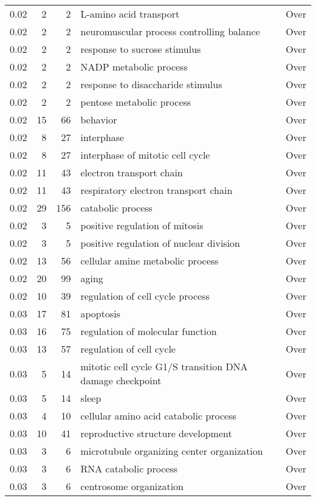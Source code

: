 \documentclass[10pt]{bmc_article}
\newenvironment{bmcformat}{\begin{raggedright}\baselineskip20pt\sloppy\setboolean{publ}{false}}{\end{raggedright}\baselineskip20pt\sloppy}
\begin{document}
\begin{bmcformat}
\begin{longtable}{rrrp{4cm}r}
  0.02 &   2 &   2 & L-amino acid transport & Over \\ 
  0.02 &   2 &   2 & neuromuscular process controlling balance & Over \\ 
  0.02 &   2 &   2 & response to sucrose stimulus & Over \\ 
  0.02 &   2 &   2 & NADP metabolic process & Over \\ 
  0.02 &   2 &   2 & response to disaccharide stimulus & Over \\ 
  0.02 &   2 &   2 & pentose metabolic process & Over \\ 
  0.02 &  15 &  66 & behavior & Over \\ 
  0.02 &   8 &  27 & interphase & Over \\ 
  0.02 &   8 &  27 & interphase of mitotic cell cycle & Over \\ 
  0.02 &  11 &  43 & electron transport chain & Over \\ 
  0.02 &  11 &  43 & respiratory electron transport chain & Over \\ 
  0.02 &  29 & 156 & catabolic process & Over \\ 
  0.02 &   3 &   5 & positive regulation of mitosis & Over \\ 
  0.02 &   3 &   5 & positive regulation of nuclear division & Over \\ 
  0.02 &  13 &  56 & cellular amine metabolic process & Over \\ 
  0.02 &  20 &  99 & aging & Over \\ 
  0.02 &  10 &  39 & regulation of cell cycle process & Over \\ 
  0.03 &  17 &  81 & apoptosis & Over \\ 
  0.03 &  16 &  75 & regulation of molecular function & Over \\ 
  0.03 &  13 &  57 & regulation of cell cycle & Over \\ 
  0.03 &   5 &  14 & mitotic cell cycle G1/S transition DNA damage checkpoint & Over \\ 
  0.03 &   5 &  14 & sleep & Over \\ 
  0.03 &   4 &  10 & cellular amino acid catabolic process & Over \\ 
  0.03 &  10 &  41 & reproductive structure development & Over \\ 
  0.03 &   3 &   6 & microtubule organizing center organization & Over \\ 
  0.03 &   3 &   6 & RNA catabolic process & Over \\ 
  0.03 &   3 &   6 & centrosome organization & Over \\ 

\end{longtable}
\end{bmcformat}
\end{document}
